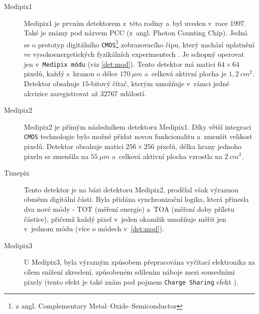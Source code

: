 \begin{description}
	\item[Medipix1] Medipix1 je prvním detektorem z~této rodiny a~byl uveden v~roce 1997. Také je známy pod názvem PCC (z~angl. Photon Counting Chip). Jedná se o prototyp digitálního \texttt{CMOS}\footnote{z angl. Complementary Metal–Oxide–Semiconductor} zobrazovacího čipu, který nachází uplatnění ve vysokoenergetických fyzikálních experimentech \cite{medipix-www}. Je schopný operovat jen v~\texttt{Medipix módu} (viz \ref{det:mod}). Tento detektor má matici $64\times64$ pixelů, každý s~hranou o délce $170~\mu m$ a~celková aktivní plocha je $1,2~cm^2$. Detektor obsahuje $15$-bitový čítač, kterým umožňuje v~rámci jedné akvizice zaregistrovat až $32767$ událostí.

	\item[Medipix2] Medipix2 je přímým následníkem detektoru Medipix1. 
	Díky větší integraci \texttt{CMOS} technologie bylo možné přidat novou funkcionalitu a~zmenšit velikost pixelů.
	Detektor obsahuje matici $256\times256$ pixelů, délka hrany jednoho pixelu se zmenšila na $55~\mu m$ a~celková aktivní plocha vzrostla na $2~cm^2$.

	\item[Timepix]\label{det:tim} Tento detektor je na bázi detektoru Medipix2, prodělal však výraznou obměnu digitální části. Byla přidána synchronizační logika, která přinesla dva nové módy - TOT (měření energie) a~TOA (měření doby příletu částice), přičemž každý pixel v~jeden okamžik umožňuje měřit jen v~jednom módu
	(více o módech v~\ref{det:mod}). 

	\item[Medipix3] U Medipix3, byla výrazným způsobem přepracována vyčítací elektronika za cílem snížení zkreslení, způsobeném sdílením náboje mezi sousedními pixely (tento efekt je také znám pod pojmem \texttt{Charge Sharing} efekt \cite{Jakubek-radiography_and_charge_sharing}). 




\end{description}
